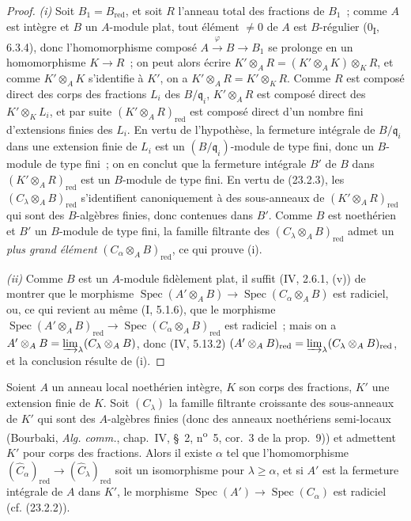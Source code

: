 \begin{proof}
\emph{(i)} Soit $B_1=B_{\mathrm{red}}$, et soit $R$ l'anneau total des
fractions de $B_1$~; comme $A$ est intègre et $B$ un $A$-module plat, tout
élément $\neq0$ de $A$ est $B$-régulier (0\textsubscript{I}, 6.3.4), donc
l'homomorphisme composé $A\xrightarrow{\varphi}B\to B_1$ se prolonge en un
homomorphisme $K\to R$~; on peut alors écrire
$K'\otimes_AR=(K'\otimes_AK)\otimes_KR$, et comme $K'\otimes_AK$
s'identifie à $K'$, on a $K'\otimes_AR=K'\otimes_KR$. Comme $R$ est composé
direct des corps des fractions $L_i$ des $B/\mathfrak q_i$,
$K'\otimes_AR$ est composé direct des $K'\otimes_KL_i$, et par suite
$(K'\otimes_AR)_{\mathrm{red}}$ est composé direct d'un nombre fini
d'extensions finies des $L_i$. En vertu de l'hypothèse, la fermeture
intégrale de $B/\mathfrak q_i$ dans une extension finie de $L_i$ est un
$(B/\mathfrak q_i)$-module de type fini, donc un $B$-module de type fini~;
on en conclut que la fermeture intégrale $B'$ de $B$ dans
$(K'\otimes_AR)_{\mathrm{red}}$ est un $B$-module de type fini. En vertu de
(23.2.3), les $(C_\lambda\otimes_AB)_{\mathrm{red}}$ s'identifient
canoniquement à des sous-anneaux de $(K'\otimes_AR)_{\mathrm{red}}$ qui sont
des $B$-algèbres finies, donc contenues dans $B'$. Comme $B$ est noethérien
et $B'$ un $B$-module de type fini, la famille filtrante des
$(C_\lambda\otimes_AB)_{\mathrm{red}}$ admet un \emph{plus grand élément}
$(C_\alpha\otimes_AB)_{\mathrm{red}}$, ce qui prouve (i).

\emph{(ii)} Comme $B$ est un $A$-module fidèlement plat, il suffit
(IV, 2.6.1, (v)) de montrer que le morphisme
$\operatorname{Spec}(A'\otimes_AB)\to
\operatorname{Spec}(C_\alpha\otimes_AB)$ est radiciel, ou, ce qui revient au
même (I, 5.1.6), que le morphisme
$\operatorname{Spec}(A'\otimes_AB)_{\mathrm{red}}\to
\operatorname{Spec}(C_\alpha\otimes_AB)_{\mathrm{red}}$ est radiciel~; mais
on a $A'\otimes_AB=\varinjlim_\lambda(C_\lambda\otimes_AB)$, donc
(IV, 5.13.2)
$(A'\otimes_AB)_{\mathrm{red}}=
\varinjlim_\lambda(C_\lambda\otimes_AB)_{\mathrm{red}}$, et la conclusion
résulte de (i).
\end{proof}

\begin{corollary}[23.2.5]
\label{0.23.2.5-fr}
Soient $A$ un anneau local noethérien intègre, $K$ son corps des fractions,
$K'$ une extension finie de $K$. Soit $(C_\lambda)$ la famille filtrante
croissante des sous-anneaux de $K'$ qui sont des $A$-algèbres finies (donc
des anneaux noethériens semi-locaux (Bourbaki, \emph{Alg. comm.}, chap.~IV,
§~2, n\textsuperscript{o}~5, cor.~3 de la prop.~9)) et admettent $K'$ pour
corps des fractions. Alors il existe $\alpha$ tel que l'homomorphisme
$(\widehat C_\alpha)_{\mathrm{red}}\to
(\widehat C_\lambda)_{\mathrm{red}}$ soit un isomorphisme pour
$\lambda\geqslant\alpha$, et si $A'$ est la fermeture intégrale de $A$ dans
$K'$, le morphisme
$\operatorname{Spec}(A')\to\operatorname{Spec}(C_\alpha)$ est radiciel
(cf. (23.2.2)).
\end{corollary}

